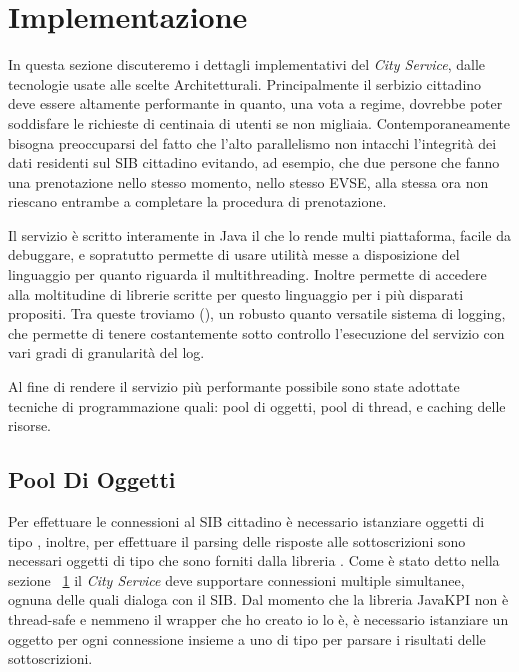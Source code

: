 \section{Implementazione}\label{sec:impl}

In questa sezione discuteremo i dettagli implementativi del \emph{City Service}, dalle tecnologie usate alle scelte Architetturali. Principalmente il serbizio cittadino deve essere altamente performante in quanto, una vota a regime, dovrebbe poter soddisfare le richieste di centinaia di utenti se non migliaia. Contemporaneamente bisogna preoccuparsi del fatto che l'alto parallelismo non intacchi l'integrità dei dati residenti sul SIB cittadino evitando, ad esempio, che due persone che fanno una prenotazione nello stesso momento, nello stesso EVSE, alla stessa ora non riescano entrambe a completare la procedura di prenotazione. 

Il servizio è scritto interamente in Java il che lo rende multi piattaforma, facile da debuggare, e sopratutto permette di usare utilità messe a disposizione del linguaggio per quanto riguarda il multithreading. Inoltre permette di accedere alla moltitudine di librerie scritte per questo linguaggio per i più disparati propositi. Tra queste troviamo (), un robusto quanto versatile sistema di logging, che permette di tenere costantemente sotto controllo l'esecuzione del servizio con vari gradi di granularità del log.

Al fine di rendere il servizio più performante possibile sono state adottate tecniche di programmazione quali: pool di oggetti, pool di thread, e caching delle risorse.


\subsection{Pool Di Oggetti}

Per effettuare le connessioni al SIB cittadino è necessario istanziare oggetti di tipo , inoltre, per effettuare il parsing delle risposte alle sottoscrizioni sono necessari oggetti di tipo  che sono forniti dalla libreria . Come è stato detto nella sezione ~\ref{sec:impl} il \emph{City Service} deve supportare connessioni multiple simultanee, ognuna delle quali dialoga con il SIB. Dal momento che la libreria {JavaKPI} non è thread-safe e nemmeno il wrapper che ho creato io lo è, è necessario istanziare un oggetto  per ogni connessione insieme a uno di tipo  per parsare i risultati delle sottoscrizioni.

